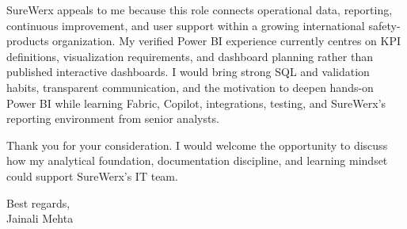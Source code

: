 \documentclass[letterpaper,11pt]{article}
\begin{document}
\bigbreak
SureWerx appeals to me because this role connects operational data, reporting, continuous improvement, and user support within a growing international safety-products organization. My verified Power BI experience currently centres on KPI definitions, visualization requirements, and dashboard planning rather than published interactive dashboards. I would bring strong SQL and validation habits, transparent communication, and the motivation to deepen hands-on Power BI while learning Fabric, Copilot, integrations, testing, and SureWerx's reporting environment from senior analysts.

\bigbreak
Thank you for your consideration. I would welcome the opportunity to discuss how my analytical foundation, documentation discipline, and learning mindset could support SureWerx's IT team.

\bigbreak
Best regards,\\
Jainali Mehta
\end{document}
